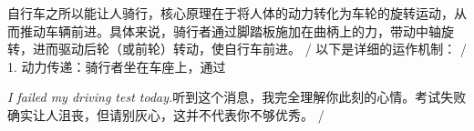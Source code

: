 \begin{multicols}{2}
自\allowbreak{}行\allowbreak{}车\allowbreak{}之\allowbreak{}所\allowbreak{}以\allowbreak{}能\allowbreak{}让\allowbreak{}人\allowbreak{}骑\allowbreak{}\allowbreak{}行\allowbreak{}，\allowbreak{}核\allowbreak{}心\allowbreak{}原\allowbreak{}理\allowbreak{}在\allowbreak{}于\allowbreak{}将\allowbreak{}人\allowbreak{}\allowbreak{}体\allowbreak{}的\allowbreak{}动\allowbreak{}力\allowbreak{}转\allowbreak{}化\allowbreak{}为\allowbreak{}车\allowbreak{}轮\allowbreak{}的\allowbreak{}\allowbreak{}旋\allowbreak{}转\allowbreak{}运\allowbreak{}动\allowbreak{}，\allowbreak{}从\allowbreak{}而\allowbreak{}推\allowbreak{}动\allowbreak{}车\allowbreak{}\allowbreak{}辆\allowbreak{}前\allowbreak{}进\allowbreak{}。\allowbreak{}具\allowbreak{}体\allowbreak{}来\allowbreak{}说\allowbreak{}，\allowbreak{}骑\allowbreak{}\allowbreak{}行\allowbreak{}者\allowbreak{}通\allowbreak{}过\allowbreak{}脚\allowbreak{}踏\allowbreak{}板\allowbreak{}施\allowbreak{}加\allowbreak{}在\allowbreak{}\allowbreak{}曲\allowbreak{}柄\allowbreak{}上\allowbreak{}的\allowbreak{}力\allowbreak{}，\allowbreak{}带\allowbreak{}动\allowbreak{}中\allowbreak{}轴\allowbreak{}\allowbreak{}旋\allowbreak{}转\allowbreak{}，\allowbreak{}进\allowbreak{}而\allowbreak{}驱\allowbreak{}动\allowbreak{}后\allowbreak{}轮\allowbreak{}（\allowbreak{}\allowbreak{}或\allowbreak{}前\allowbreak{}轮\allowbreak{}）\allowbreak{}转\allowbreak{}动\allowbreak{}，\allowbreak{}使\allowbreak{}自\allowbreak{}行\allowbreak{}\allowbreak{}车\allowbreak{}前\allowbreak{}进\allowbreak{}。\allowbreak{} / 以\allowbreak{}下\allowbreak{}是\allowbreak{}详\allowbreak{}细\allowbreak{}的\allowbreak{}运\allowbreak{}作\allowbreak{}机\allowbreak{}制\allowbreak{}：\allowbreak{} / 1. 动\allowbreak{}力\allowbreak{}传\allowbreak{}递\allowbreak{}：\allowbreak{}骑\allowbreak{}行\allowbreak{}者\allowbreak{}坐\allowbreak{}在\allowbreak{}车\allowbreak{}座\allowbreak{}上\allowbreak{}，\allowbreak{}通\allowbreak{}过\allowbreak{}\par\noindent\textit{I failed my driving test today.}\enspace 听\allowbreak{}到\allowbreak{}这\allowbreak{}个\allowbreak{}消\allowbreak{}息\allowbreak{}，\allowbreak{}我\allowbreak{}完\allowbreak{}全\allowbreak{}\allowbreak{}理\allowbreak{}解\allowbreak{}你\allowbreak{}此\allowbreak{}刻\allowbreak{}的\allowbreak{}心\allowbreak{}情\allowbreak{}。\allowbreak{}考\allowbreak{}\allowbreak{}试\allowbreak{}失\allowbreak{}败\allowbreak{}确\allowbreak{}实\allowbreak{}让\allowbreak{}人\allowbreak{}沮\allowbreak{}丧\allowbreak{}，\allowbreak{}\allowbreak{}但\allowbreak{}请\allowbreak{}别\allowbreak{}灰\allowbreak{}心\allowbreak{}，\allowbreak{}这\allowbreak{}并\allowbreak{}不\allowbreak{}代\allowbreak{}\allowbreak{}表\allowbreak{}你\allowbreak{}不\allowbreak{}够\allowbreak{}优\allowbreak{}秀\allowbreak{}。\allowbreak{} / 
\end{multicols}
